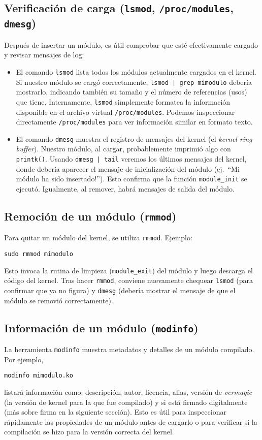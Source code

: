 \subsection*{Verificación de carga (\texttt{lsmod}, \texttt{/proc/modules}, \texttt{dmesg})}
Después de insertar un módulo, es útil comprobar que esté efectivamente cargado y revisar mensajes de log:
\begin{itemize}
  \item El comando \texttt{lsmod} lista todos los módulos actualmente cargados en el kernel. Si nuestro módulo se cargó correctamente, \texttt{lsmod | grep mimodulo} debería mostrarlo, indicando también su tamaño y el número de referencias (usos) que tiene. Internamente, \texttt{lsmod} simplemente formatea la información disponible en el archivo virtual \texttt{/proc/modules}. Podemos inspeccionar directamente \texttt{/proc/modules} para ver información similar en formato texto.
  \item El comando \texttt{dmesg} muestra el registro de mensajes del kernel (el \emph{kernel ring buffer}). Nuestro módulo, al cargar, probablemente imprimió algo con \texttt{printk()}. Usando \texttt{dmesg | tail} veremos los últimos mensajes del kernel, donde debería aparecer el mensaje de inicialización del módulo (ej.\ ``Mi módulo ha sido insertado!''). Esto confirma que la función \texttt{module\_init} se ejecutó. Igualmente, al remover, habrá mensajes de salida del módulo.
\end{itemize}

\subsection*{Remoción de un módulo (\texttt{rmmod})}
Para quitar un módulo del kernel, se utiliza \texttt{rmmod}. Ejemplo:
\begin{lstlisting}
sudo rmmod mimodulo
\end{lstlisting}
Esto invoca la rutina de limpieza (\texttt{module\_exit}) del módulo y luego descarga el código del kernel. Tras hacer \texttt{rmmod}, conviene nuevamente chequear \texttt{lsmod} (para confirmar que ya no figura) y \texttt{dmesg} (debería mostrar el mensaje de que el módulo se removió correctamente).

\subsection*{Información de un módulo (\texttt{modinfo})}
La herramienta \texttt{modinfo} muestra metadatos y detalles de un módulo compilado. Por ejemplo,
\begin{lstlisting}
modinfo mimodulo.ko
\end{lstlisting}
listará información como: descripción, autor, licencia, alias, versión de \emph{vermagic} (la versión de kernel para la que fue compilado) y si está firmado digitalmente (más sobre firma en la siguiente sección). Esto es útil para inspeccionar rápidamente las propiedades de un módulo antes de cargarlo o para verificar si la compilación se hizo para la versión correcta del kernel.

